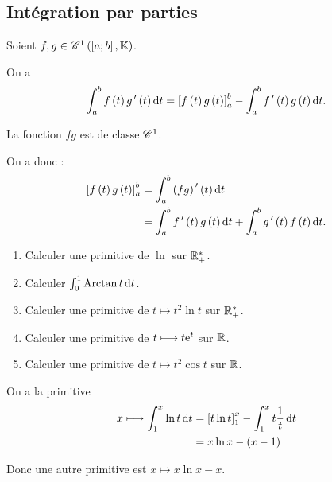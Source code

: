 \subsection{Intégration par parties}

\begin{prop}
Soient \(f,g\in\mathscr{C}^{1}\left(\left[a;b\right],\mathbb{K}\right)\).

On a \[\int_a^bf\paren{t}g\prim\paren{t}\odif{t}=\croch{f\paren{t}g\paren{t}}_a^b-\int_a^bf\prim\paren{t}g\paren{t}\odif{t}.\]
\end{prop}

\begin{dem}
La fonction \(fg\) est de classe \(\mathscr{C}^{1}\).

On a donc : \[\begin{aligned}
\croch{f\paren{t}g\paren{t}}_a^b&=\int_a^b\paren{fg}\prim\paren{t}\odif{t} \\
&=\int_a^bf\prim\paren{t}g\paren{t}\odif{t}+\int_a^bg\prim\paren{t}f\paren{t}\odif{t}.
\end{aligned}\]
\end{dem}

\begin{exoex}
\begin{enumerate}
\item Calculer une primitive de \(\ln\) sur \(\mathbb{R}_+^*\). \\

\item Calculer \(\int_0^1\Arctan t\odif{t}\). \\

\item Calculer une primitive de \(t\mapsto t^2\ln t\) sur \(\mathbb{R}_+^*\). \\

\item Calculer une primitive de \(t\longmapsto t\mathrm{e}^{t}\) sur \(\mathbb{R}\). \\

\item Calculer une primitive de \(t\mapsto t^2\cos t\) sur \(\mathbb{R}\).
\end{enumerate}
\end{exoex}

\begin{corr}[1]
On a la primitive \[\begin{aligned}
x\mapsto\int_1^x\ln t\odif{t}&=\croch{t\ln t}_1^x-\int_1^xt\dfrac{1}{t}\odif{t} \\
&=x\ln x-\paren{x-1}
\end{aligned}\]

Donc une autre primitive est \(x\mapsto x\ln x-x\).
\end{corr}


